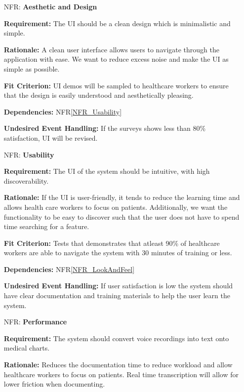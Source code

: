 \documentclass[12pt]{article}
\newcounter{nfrnum} %
\begin{document}
\noindent \begin{itemize}

\item[NFR\refstepcounter{nfrnum}\thenfrnum \label{NFR_LookAndFeel}:] \textbf{Aesthetic and Design}

    \textbf{Requirement:} The UI should be a clean design which is minimalistic and simple.

    \textbf{Rationale:} A clean user interface allows users to navigate through the application with ease. We want to reduce excess noise and make the UI as simple as possible.

    \textbf{Fit Criterion:} UI demos will be sampled to healthcare workers to ensure that the design is easily understood and aesthetically pleasing.

    \textbf{Dependencies:} NFR\ref{NFR_Usability}

    \textbf{Undesired Event Handling:} If the surveys shows less than 80\% satisfaction, UI will be revised.


\item[NFR\refstepcounter{nfrnum}\thenfrnum \label{NFR_Usability}:] \textbf{Usability}

    \textbf{Requirement:} The UI of the system should be intuitive, with high discoverability.

    \textbf{Rationale:} If the UI is user-friendly, it tends to reduce the learning time and allows health care workers to focus on patients. Additionally, we want the functionality to be easy to discover such that the user does not have to spend time searching for a feature.
  

    \textbf{Fit Criterion:} Tests that demonstrates that atleast 90\% of healthcare workers are able to navigate the system with 30 minutes of training or less.

    \textbf{Dependencies:} NFR\ref{NFR_LookAndFeel}

    \textbf{Undesired Event Handling:} If user satisfaction is low the system should have clear documentation and training materials to help the user learn the system.

\item[NFR\refstepcounter{nfrnum}\thenfrnum \label{NFR_Performance}:] \textbf{Performance}

    \textbf{Requirement:} The system should convert voice recordings into text onto medical charts.

    \textbf{Rationale:} Reduces the documentation time to reduce workload and allow healthcare workers to focus on patients. Real time transcription will allow for lower friction when documenting.
    

\end{itemize}
\end{document}
